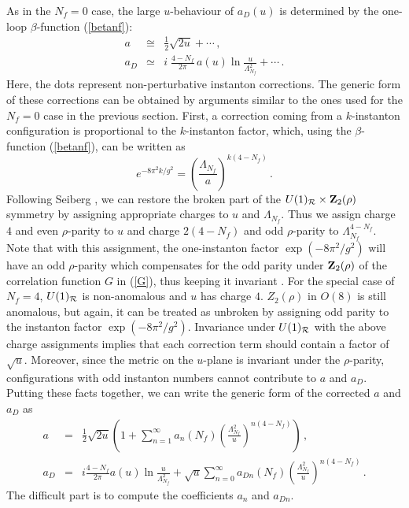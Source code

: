 As in the $N_f = 0$ case, the large $u$-behaviour of $a_D(u)$ is
determined by the one-loop $\beta$-function (\ref{betanf}):
\begin{eqnarray}
a &\cong& \frac{1}{2} \sqrt{2u} + \cdots \,,\nonumber\\
a_D &\simeq& i \;\frac{4-N_f}{2\pi}\,a(u)\ln\frac{u}{\Lambda^2_{N_f}}
+ \cdots \,.\label{betanf-mon}
\end{eqnarray}
Here, the dots represent non-perturbative instanton corrections. The
generic form of these corrections can be obtained by arguments similar
to the ones used for the $N_f=0$ case in the previous section. First,
a correction coming from a $k$-instanton configuration is proportional
to the $k$-instanton factor, which, using the $\beta$-function
(\ref{betanf}), can be written as 
\begin{equation}
e^{-8\pi^2k/g^2} =\left(\frac{\Lambda_{N_f}}{a}\right)^{k(4-N_f)}\,. 
\label{inst-nf}
\end{equation}
Following Seiberg \cite{Seiberg-n,Seiberg-poh}, we can restore the
broken part of the $U(1)_{\cal R} \times {\bf Z}_2 (\rho )$ symmetry
by assigning appropriate charges to $u$ and $\Lambda_{N_f}$.  Thus we
assign charge $4$ and even $\rho$-parity to $u$ and charge $2 (4-N_f)$
and odd $\rho$-parity to $\Lambda_{N_f}^{4-N_f}$. Note that with this
assignment, the one-instanton factor $\exp(-8\pi^2/g^2)$ will have an
odd $\rho$-parity which compensates for the odd parity under ${\bf
Z}_2(\rho)$ of the correlation function $G$ in (\ref{G}), thus keeping
it invariant . For the special case of $N_f=4$, $U(1)_{\cal R}$ is
non-anomalous and $u$ has charge $4$. $Z_2(\rho)$ in $O(8)$ is still
anomalous, but again, it can be treated as unbroken by assigning odd
parity to the instanton factor $\exp(-8\pi^2/g^2)$. Invariance under
$U(1)_{\cal R}$ with the above charge assignments implies that each
correction term should contain a factor of $\sqrt u$. Moreover, since
the metric on the $u$-plane is invariant under the $\rho$-parity,
configurations with odd instanton numbers cannot contribute to $a$ and
$a_D$. Putting these facts together, we can write the generic form of
the corrected $a$ and $a_D$ as
\begin{eqnarray}
a &=& \frac{1}{2} \sqrt{2u} \left ( 1 + \sum_{n=1}^\infty a_n (N_f)
\left(\frac{\Lambda^2_{N_f}}{u}\right)^{n(4-N_f)} \right )\,,
\nonumber\\
a_D &=& i \frac{4-N_f}{2 \pi} a(u) \ln \frac{u}{\Lambda^2_{N_f}} +
\sqrt{u} \sum_{n=0}^\infty  a_{Dn} (N_f) \left(\frac{\Lambda^2_{N_f}}
{u}\right)^{n(4-N_f)} \,.\nonumber
\end{eqnarray}
The difficult part is to compute the coefficients $a_n$ and $a_{Dn}$.

